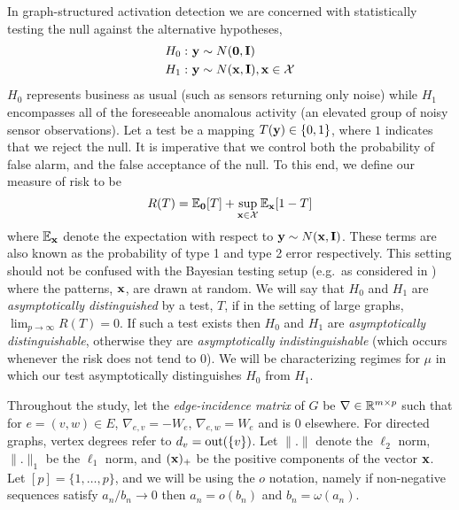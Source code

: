 In graph-structured activation detection we are concerned with statistically testing the null against the alternative hypotheses,
\vspace{-.25cm}
\begin{eqnarray}
\begin{aligned}
H_0:&\ \mathbf{y} \sim N({\bf 0},\mathbf{I}) \\
H_1:&\ \mathbf{y} \sim N(\mathbf{x},\mathbf{I}), \mathbf{x} \in \mathcal{X}\\
\end{aligned}
\label{eq:main_problem}
\end{eqnarray}
$H_0$ represents business as usual (such as sensors returning only noise) while $H_1$ encompasses all of the foreseeable anomalous activity (an elevated group of noisy sensor observations).
Let a test be a mapping $T(\mathbf{y}) \in \{0,1\}$, where $1$ indicates that we reject the null.
It is imperative that we control both the probability of false alarm, and the false acceptance of the null.
To this end, we define our measure of risk to be
\[
R(T) = \mathbb{E}_{{\bf 0}} [T] + \sup_{\mathbf{x} \in \mathcal{X}} \mathbb{E}_{\mathbf{x}} [1 - T]
\]
where $\mathbb{E}_{\mathbf{x}}$ denote the expectation with respect to $\mathbf{y} \sim N(\mathbf{x},\mathbf{I})$.
These terms are also known as the probability of type 1 and type 2 error respectively. 
This setting should not be confused with the Bayesian testing setup (e.g.~as considered in \cite{addario2010combinatorial,arias2008searching}) where the patterns, $\mathbf{x}$, are drawn at random.
We will say that $H_0$ and $H_1$ are {\em asymptotically distinguished} by a test, $T$, if 
in the setting of large graphs, $\lim_{p \rightarrow \infty} R(T) = 0$.
If such a test exists then $H_0$ and $H_1$ are {\em asymptotically distinguishable}, otherwise they are {\em asymptotically indistinguishable} (which occurs whenever the risk does not tend to $0$).   
We will be characterizing regimes for $\mu$ in which our test asymptotically distinguishes $H_0$ from $H_1$.

Throughout the study, let the {\em edge-incidence matrix} of $G$ be $\nabla \in \mathbb{R}^{m \times p}$ such that for $e = (v,w) \in E$, $\nabla_{e,v} = -W_e$, $\nabla_{e,w} = W_e$ and is $0$ elsewhere.
For directed graphs, vertex degrees refer to $d_v = \textrm{out}(\{v\})$.
Let $\|.\|$ denote the $\ell_2$ norm, $\|.\|_1$ be the $\ell_1$ norm, and $(\mathbf{x})_+$ be the positive components of the vector $\mathbf{x}$.
Let $[p] = \{1,\ldots,p\}$, and we will be using the $o$ notation, namely if non-negative sequences satisfy $a_n / b_n \rightarrow 0$ then $a_n = o(b_n)$ and $b_n = \omega(a_n)$.
\vspace{-.1cm}
